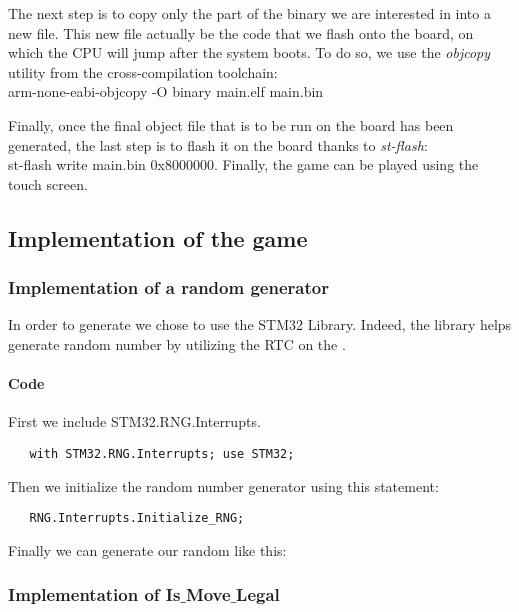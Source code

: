 The next step is to copy only the part of the binary we are interested in into
a new file. This new file actually be the code that we flash onto the board,
on which the CPU will jump after the system boots. To do so, we use the
\textit{objcopy} utility from the cross-compilation toolchain:\\
arm-none-eabi-objcopy -O binary main.elf main.bin

Finally, once the final object file that is to be run on the board has been
generated, the last step is to flash it on the board thanks to \textit{st-flash}:\\
st-flash write main.bin 0x8000000. Finally, the game can be played using the
touch screen.
\newpage

\subsection{Implementation of the game}

\subsubsection{Implementation of a random \sq generator}

In order to generate \sqs we chose to use the STM32 Library.
Indeed, the library helps generate random number by utilizing the RTC on the \stmdb.

\paragraph{Code}

\noindent
First we include STM32.RNG.Interrupts.
\begin{lstlisting}
   with STM32.RNG.Interrupts; use STM32;
\end{lstlisting}


\noindent
Then we initialize the random number generator using this statement:
\begin{lstlisting}
   RNG.Interrupts.Initialize_RNG;
\end{lstlisting}


\noindent
Finally we can generate our random \sqs like this:




\newpage

\subsubsection{Implementation of Is$\_$Move$\_$Legal}

